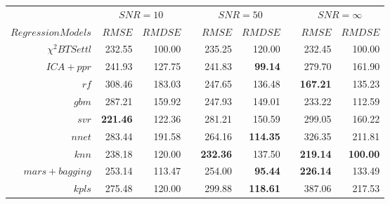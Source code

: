 \newcommand{\ra}[1]{\renewcommand{\arraystretch}{#1}}
\begin{table}\centering
\ra{1.3}
\begin{tabular}{@{}rrrcrrcrr@{}}\toprule
& \multicolumn{2}{c}{$SNR = 10$} & \phantom{ab}& \multicolumn{2}{c}{$SNR = 50$} &
\phantom{ab} & \multicolumn{2}{c}{$SNR = \infty$}\\
\cmidrule{2-3} \cmidrule{5-6} \cmidrule{8-9}
$Regression Models$ & $RMSE$ & $RMDSE$ && $RMSE$ & $RMDSE$ && $RMSE$ & $RMDSE$ \\ \midrule
$\chi^2 BTSettl$    &  232.55 & 100.00 && 235.25 & 120.00 && 232.45 & 100.00 \\
$ ICA+ ppr$         & 241.93 & 127.75 && 241.83 & \bf{99.14} && 279.70 & 161.90 \\
$rf $               & 308.46 & 183.03 && 247.65 & 136.48 && \bf{167.21} & 135.23 \\
$ gbm $              & 287.21 & 159.92 && 247.93 & 149.01 && 233.22 & 112.59 \\
$ svr $         & \bf{221.46} & 122.36 && 281.21 & 150.59 && 299.05 & 160.22 \\
$ nnet $            & 283.44 & 191.58 && 264.16 & \bf{114.35} && 326.35 & 211.81 \\
$ knn $             & 238.18 & 120.00 && \bf{232.36} & 137.50 && \bf{219.14} & \bf{100.00}  \\
$ mars+ bagging $   & 253.14 & 113.47 && 254.00 & \bf{95.44} && \bf{226.14} & 133.49 \\
$ kpls $            & 275.48 & 120.00 && 299.88 & \bf{118.61} && 387.06 & 217.53 \\







\end{tabular}
\end{table}
